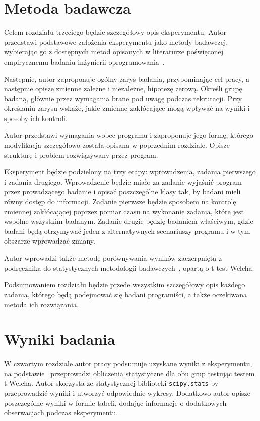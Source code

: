 \chapter{Metoda badawcza}

Celem rozdziału trzeciego będzie szczegółowy opis eksperymentu.
Autor przedstawi podstawowe założenia eksperymentu jako metody badawczej, wybierając go z dostępnych metod
opisanych w literaturze poświęconej empirycznemu badaniu inżynierii oprogramowania~\cite{fowler2018refactoring}.

Następnie, autor zaproponuje ogólny zarys badania, przypominając cel pracy, a następnie opisze zmienne zależne i
niezależne, hipotezę zerową.
Określi grupę badaną, głównie przez wymagania brane pod uwagę podczas rekrutacji.
Przy określaniu zarysu wskaże, jakie zmienne zakłócające mogą wpływać na wyniki i sposoby ich kontroli.

Autor przedstawi wymagania wobec programu i zaproponuje jego formę, którego modyfikacja szczegółowo została
opisana w poprzednim rozdziale.
Opisze strukturę i problem rozwiązywany przez program.

Eksperyment będzie podzielony na trzy etapy: wprowadzenia, zadania pierwszego i zadania drugiego.
Wprowadzenie będzie miało za zadanie wyjaśnić program przez prowadzącego badanie i opisać poszczególne klasy tak,
by badani mieli równy dostęp do informacji.
Zadanie pierwsze będzie sposobem na kontrolę zmiennej zakłócającej poprzez pomiar czasu na wykonanie zadania,
które jest wspólne wszystkim badanym.
Zadanie drugie będzię badaniem właściwym, gdzie badani będą otrzymywać jeden z alternatywnych scenariuszy programu
i w tym obszarze wprowadzać zmiany.

Autor wprowadzi także metodę porównywania wyników zaczerpniętą z podręcznika do statystycznych metodologii
badawczych~\cite{arciszewska2023metodologia}, opartą o t test Welcha.

Podsumowaniem rozdziału będzie przede wszystkim szczegółowy opis każdego zadania, którego będą podejmować się
badani programiści, a także oczekiwana metoda ich rozwiązania.

\chapter{Wyniki badania}

W czwartym rozdziale autor pracy podsumuje uzyskane wyniki z eksperymentu, na
podstawie~\cite{arciszewska2023metodologia} przeprowadzi obliczenia statystyczne dla obu grup testując
testem t Welcha.
Autor skorzysta ze statystycznej biblioteki \texttt{scipy.stats} by przeprowadzić wyniki i utworzyć odpowiednie
wykresy.
Dodatkowo autor opisze poszczególne wyniki w formie tabeli, dodając informacje o dodatkowych obserwacjach podczas
eksperymentu.


